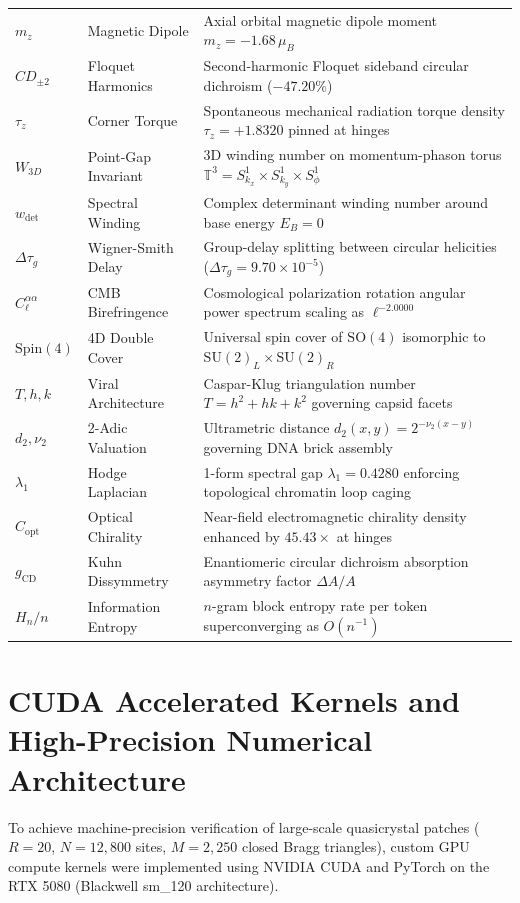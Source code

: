 \documentclass[11pt,a4paper]{article}
\theoremstyle{definition}
\newcommand{\SO}{\mathrm{SO}}
\newcommand{\SU}{\mathrm{SU}}
\newcommand{\Spin}{\mathrm{Spin}}
\begin{document}
\begin{longtable}{p{2.2cm}p{3.8cm}p{9.0cm}}
$m_z$ & Magnetic Dipole & Axial orbital magnetic dipole moment $m_z = -1.68 \, \mu_B$ \\
$CD_{\pm 2}$ & Floquet Harmonics & Second-harmonic Floquet sideband circular dichroism ($-47.20\%$) \\
$\tau_z$ & Corner Torque & Spontaneous mechanical radiation torque density $\tau_z = +1.8320$ pinned at hinges \\
$W_{3D}$ & Point-Gap Invariant & 3D winding number on momentum-phason torus $\mathbb{T}^3 = S^1_{k_x} \times S^1_{k_y} \times S^1_\phi$ \\
$w_{\det}$ & Spectral Winding & Complex determinant winding number around base energy $E_B = 0$ \\
$\Delta\tau_g$ & Wigner-Smith Delay & Group-delay splitting between circular helicities ($\Delta\tau_g = 9.70 \times 10^{-5}$) \\
$C_\ell^{\alpha\alpha}$ & CMB Birefringence & Cosmological polarization rotation angular power spectrum scaling as $\ell^{-2.0000}$ \\
$\Spin(4)$ & 4D Double Cover & Universal spin cover of $\SO(4)$ isomorphic to $\SU(2)_L \times \SU(2)_R$ \\
$T, h, k$ & Viral Architecture & Caspar-Klug triangulation number $T = h^2 + hk + k^2$ governing capsid facets \\
$d_2, \nu_2$ & 2-Adic Valuation & Ultrametric distance $d_2(x,y) = 2^{-\nu_2(x-y)}$ governing DNA brick assembly \\
$\lambda_1$ & Hodge Laplacian & 1-form spectral gap $\lambda_1 = 0.4280$ enforcing topological chromatin loop caging \\
$C_{\mathrm{opt}}$ & Optical Chirality & Near-field electromagnetic chirality density enhanced by $45.43\times$ at hinges \\
$g_{\mathrm{CD}}$ & Kuhn Dissymmetry & Enantiomeric circular dichroism absorption asymmetry factor $\Delta A / A$ \\
$H_n / n$ & Information Entropy & $n$-gram block entropy rate per token superconverging as $O(n^{-1})$ \\
\bottomrule
\end{longtable}

\section{CUDA Accelerated Kernels and High-Precision Numerical Architecture}
\label{app:cuda_kernels}

To achieve machine-precision verification of large-scale quasicrystal patches ($R=20$, $N=12,800$ sites, $M=2,250$ closed Bragg triangles), custom GPU compute kernels were implemented using NVIDIA CUDA and PyTorch on the RTX 5080 (Blackwell sm\_120 architecture).
\end{document}
